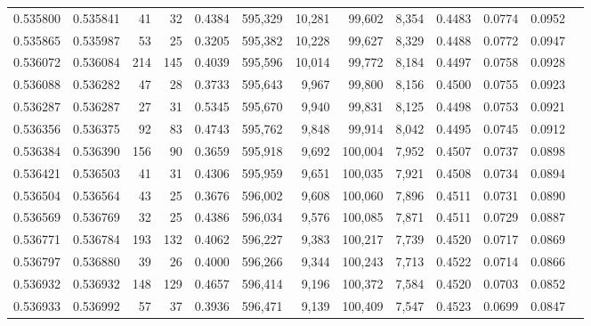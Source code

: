 \begin{tabular}{rrrrrrrrrrrrr}
0.535800 & 0.535841 &    41 &    32 &                                     0.4384 & 595,329 &  10,281 &  99,602 &   8,354 & 0.4483 & 0.0774 & 0.0952 \\
0.535865 & 0.535987 &    53 &    25 &                                     0.3205 & 595,382 &  10,228 &  99,627 &   8,329 & 0.4488 & 0.0772 & 0.0947 \\
0.536072 & 0.536084 &   214 &   145 &                                     0.4039 & 595,596 &  10,014 &  99,772 &   8,184 & 0.4497 & 0.0758 & 0.0928 \\
0.536088 & 0.536282 &    47 &    28 &                                     0.3733 & 595,643 &   9,967 &  99,800 &   8,156 & 0.4500 & 0.0755 & 0.0923 \\
0.536287 & 0.536287 &    27 &    31 &                                     0.5345 & 595,670 &   9,940 &  99,831 &   8,125 & 0.4498 & 0.0753 & 0.0921 \\
0.536356 & 0.536375 &    92 &    83 &                                     0.4743 & 595,762 &   9,848 &  99,914 &   8,042 & 0.4495 & 0.0745 & 0.0912 \\
0.536384 & 0.536390 &   156 &    90 &                                     0.3659 & 595,918 &   9,692 & 100,004 &   7,952 & 0.4507 & 0.0737 & 0.0898 \\
0.536421 & 0.536503 &    41 &    31 &                                     0.4306 & 595,959 &   9,651 & 100,035 &   7,921 & 0.4508 & 0.0734 & 0.0894 \\
0.536504 & 0.536564 &    43 &    25 &                                     0.3676 & 596,002 &   9,608 & 100,060 &   7,896 & 0.4511 & 0.0731 & 0.0890 \\
0.536569 & 0.536769 &    32 &    25 &                                     0.4386 & 596,034 &   9,576 & 100,085 &   7,871 & 0.4511 & 0.0729 & 0.0887 \\
0.536771 & 0.536784 &   193 &   132 &                                     0.4062 & 596,227 &   9,383 & 100,217 &   7,739 & 0.4520 & 0.0717 & 0.0869 \\
0.536797 & 0.536880 &    39 &    26 &                                     0.4000 & 596,266 &   9,344 & 100,243 &   7,713 & 0.4522 & 0.0714 & 0.0866 \\
0.536932 & 0.536932 &   148 &   129 &                                     0.4657 & 596,414 &   9,196 & 100,372 &   7,584 & 0.4520 & 0.0703 & 0.0852 \\
0.536933 & 0.536992 &    57 &    37 &                                     0.3936 & 596,471 &   9,139 & 100,409 &   7,547 & 0.4523 & 0.0699 & 0.0847 \\

\end{tabular}
